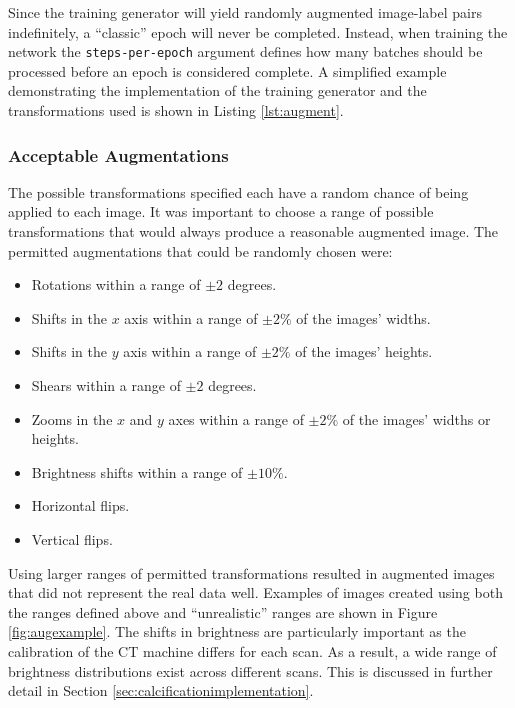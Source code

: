 Since the training generator will yield randomly augmented image-label pairs indefinitely, a ``classic'' epoch will never be completed. Instead, when training the network the \texttt{steps-per-epoch} argument defines how many batches should be processed before an epoch is considered complete. A simplified example demonstrating the implementation of the training generator and the transformations used is shown in Listing \ref{lst:augment}.

\subsubsection{Acceptable Augmentations}

The possible transformations specified each have a random chance of being applied to each image. It was important to choose a range of possible transformations that would always produce a reasonable augmented image. The permitted augmentations that could be randomly chosen were:

\begin{itemize}
    \item Rotations within a range of $\pm 2$ degrees.
    \item Shifts in the $x$ axis within a range of $\pm 2\%$ of the images' widths.
    \item Shifts in the $y$ axis within a range of $\pm 2\%$ of the images' heights.
    \item Shears within a range of $\pm 2$ degrees.
    \item Zooms in the $x$ and $y$ axes within a range of $\pm 2\%$ of the images' widths or heights.
    \item Brightness shifts within a range of $\pm 10\%$.
    \item Horizontal flips.
    \item Vertical flips.
\end{itemize}

Using larger ranges of permitted transformations resulted in augmented images that did not represent the real data well. Examples of images created using both the ranges defined above and ``unrealistic'' ranges are shown in Figure \ref{fig:augexample}. The shifts in brightness are particularly important as the calibration of the CT machine differs for each scan. As a result, a wide range of brightness distributions exist across different scans. This is discussed in further detail in Section \ref{sec:calcificationimplementation}.

